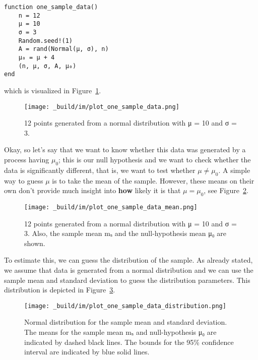 \documentclass[
  14pt
  american,
  paper=a4,
  ,captions=tableheading
]{scrbook}
\begin{document}
\begin{lstlisting}
function one_sample_data()
    n = 12
    μ = 10
    σ = 3
    Random.seed!(1)
    A = rand(Normal(μ, σ), n)
    μ₀ = μ + 4
    (n, μ, σ, A, μ₀)
end
\end{lstlisting}

which is visualized in Figure~\ref{fig:plot_one_sample_data}.

\begin{figure}
\hypertarget{fig:plot_one_sample_data}{%
\centering
\texttt{[image: \_build/im/plot\_one\_sample\_data.png]}
\caption{12 points generated from a normal distribution with μ = 10 and
σ = 3.}\label{fig:plot_one_sample_data}
}
\end{figure}

Okay, so let's say that we want to know whether this data was generated
by a process having \(\mu_0\); this is our null hypothesis and we want
to check whether the data is significantly different, that is, we want
to test whether \(\mu \neq \mu_0\). A simple way to guess \(\mu\) is to
take the mean of the sample. However, these means on their own don't
provide much insight into \textbf{how} likely it is that
\(\mu = \mu_0\), see Figure~\ref{fig:plot_one_sample_data_mean}.

\begin{figure}
\hypertarget{fig:plot_one_sample_data_mean}{%
\centering
\texttt{[image: \_build/im/plot\_one\_sample\_data\_mean.png]}
\caption{12 points generated from a normal distribution with μ = 10 and
σ = 3. Also, the sample mean mₛ and the null-hypothesis mean μ₀ are
shown.}\label{fig:plot_one_sample_data_mean}
}
\end{figure}

To estimate this, we can guess the distribution of the sample. As
already stated, we assume that data is generated from a normal
distribution and we can use the sample mean and standard deviation to
guess the distribution parameters. This distribution is depicted in
Figure~\ref{fig:plot_one_sample_data_distribution}.

\begin{figure}
\hypertarget{fig:plot_one_sample_data_distribution}{%
\centering
\texttt{[image: \_build/im/plot\_one\_sample\_data\_distribution.png]}
\caption{Normal distribution for the sample mean and standard deviation.
The means for the sample mean mₛ and null-hypothesis μ₀ are indicated by
dashed black lines. The bounds for the 95\% confidence interval are
indicated by blue solid
lines.}\label{fig:plot_one_sample_data_distribution}
}
\end{figure}
\end{document}
